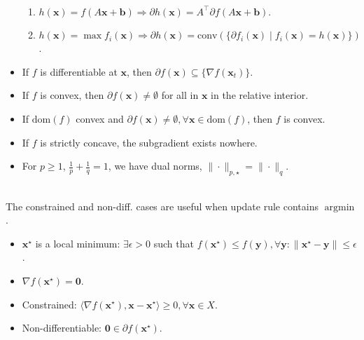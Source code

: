 \documentclass[8pt,a4paper]{extarticle}
\DeclareMathOperator*{\argmin}{argmin}
\renewcommand{\vec}[1]{\bm{#1}}
\newcommand{\mat}[1]{#1}
\newcommand{\transpose}[1]{#1^\top}
\newcommand{\dom}[1]{\mathrm{dom}(#1)}
\newenvironment{topic}[1]
{\textbf{\sffamily \colorbox{black}{\rlap{\textbf{\textcolor{white}{#1}}}\hspace{\linewidth}\hspace{-2\fboxsep}}} \\ \vspace{0.2cm}}
{}
\begin{document}
\begin{multicols*}{2}
\begin{topic}{Lemmas}
\begin{itemize}
\begin{enumerate}
                      \item $h(\vec{x}) = f(\mat{A} \vec{x} + \vec{b}) \Rightarrow \partial h(\vec{x}) = \transpose{\mat{A}} \partial f(\mat{A} \vec{x} + \vec{b})$.
                      \item $h(\vec{x}) = \max f_i(\vec{x}) \Rightarrow \partial h(\vec{x}) = \mathrm{conv}(\{ \partial f_i(\vec{x}) \mid f_i(\vec{x}) = h(\vec{x}) \})$.
                  \end{enumerate}
            \item If $f$ is differentiable at $\vec{x}$, then $\partial f(\vec{x}) \subseteq \{ \nabla f(\vec{x}_t)
                      \}$.
            \item If $f$ is convex, then $\partial f(\vec{x}) \neq \emptyset$ for all in $\vec{x}$ in the relative
                  interior.
            \item If $\dom{f}$ convex and $\partial f(\vec{x}) \neq \emptyset,\forall \vec{x} \in \dom{f}$, then $f$
                  is convex.
            \item If $f$ is strictly concave, the subgradient exists nowhere.
            \item For $p \geq 1$, $\frac{1}{p} + \frac{1}{q} = 1$, we have dual norms, $\| \cdot \|_{p,\star} = \|
                      \cdot \|_q$.
        \end{itemize}
    \end{topic}

    \begin{topic}{Optimality lemmas (assume convexity)}
        The constrained and non-diff. cases are useful when update rule contains $\argmin$.
        \begin{itemize}
            \item $\vec{x}^\star$ is a local minimum: $\exists \epsilon > 0$ such that $f(\vec{x}^\star) \leq f(\vec{y}), \forall \vec{y} : \| \vec{x}^\star - \vec{y} \| \leq \epsilon$.
            \item $\nabla f(\vec{x}^\star) = \vec{0}$.
            \item Constrained: $\langle \nabla f(\vec{x}^\star), \vec{x} - \vec{x}^\star \rangle \geq 0, \forall
                      \vec{x} \in X$.
            \item Non-differentiable: $\vec{0} \in \partial f(\vec{x}^\star)$.
        \end{itemize}
    \end{topic}


\end{multicols*}
\end{document}
